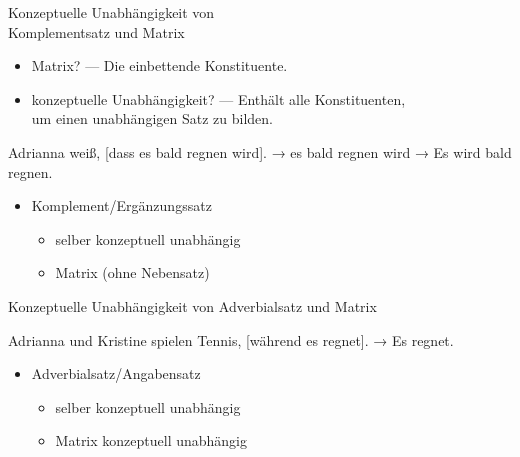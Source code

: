 \begin{frame}
  {Konzeptuelle Unabhängigkeit von\\Komplementsatz und Matrix}
  \pause
  \begin{itemize}[<+->]
    \item \alert{Matrix}? --- Die \alert{einbettende} Konstituente.
    \item \alert{konzeptuelle Unabhängigkeit}? --- Enthält alle Konstituenten,\\
      um einen unabhängigen Satz zu bilden.
  \end{itemize}
  \pause\Halbzeile
  \begin{exe}
    \ex
    \begin{xlist}
      \ex Adrianna weiß, [dass \alert{es bald regnen wird}].
      \pause
      \ex → \alert{es bald regnen wird}
      \pause
      \ex → \alert{Es wird bald regnen.}
    \end{xlist}
    \pause
  \end{exe}
  \pause\Halbzeile
  \begin{itemize}[<+->]
    \item Komplement\slash Ergänzungssatz
      \begin{itemize}[<+->]
        \item selber \alert{konzeptuell unabhängig}
        \item Matrix  (ohne Nebensatz)
      \end{itemize}
  \end{itemize}
\end{frame}

\begin{frame}
  {Konzeptuelle Unabhängigkeit von Adverbialsatz und Matrix}
  \pause
  \begin{exe}
    \ex
    \begin{xlist}
      \ex Adrianna und Kristine spielen Tennis, [während \alert{es regnet}].
      \pause
      \ex → \alert{Es regnet.}
    \end{xlist}
    \pause
    \ex {}
  \end{exe}
  \pause\Halbzeile
  \begin{itemize}[<+->]
    \item Adverbialsatz\slash Angabensatz
      \begin{itemize}[<+->]
        \item selber \alert{konzeptuell unabhängig}
        \item Matrix \alert{konzeptuell unabhängig}
      \end{itemize}
  \end{itemize}
\end{frame}


